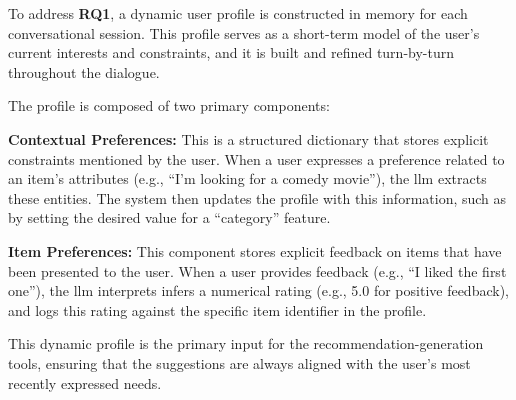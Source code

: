 To address \textbf{RQ1}, a dynamic user profile is constructed in memory for each conversational session. This profile serves as a short-term model of the user's current interests and constraints, and it is built and refined turn-by-turn throughout the dialogue.

The profile is composed of two primary components:
\begin{compactitem}[\textbullet]
    \item \textbf{Contextual Preferences:} This is a structured dictionary that stores explicit constraints mentioned by the user. When a user expresses a preference related to an item's attributes (e.g., ``I'm looking for a comedy movie''), the \ac{llm} extracts these entities. The system then updates the profile with this information, such as by setting the desired value for a ``category'' feature.
    \item \textbf{Item Preferences:} This component stores explicit feedback on items that have been presented to the user. When a user provides feedback (e.g., ``I liked the first one''), the \ac{llm} interprets infers a numerical rating (e.g., 5.0 for positive feedback), and logs this rating against the specific item identifier in the profile.
\end{compactitem}
This dynamic profile is the primary input for the recommendation-generation tools, ensuring that the suggestions are always aligned with the user's most recently expressed needs.